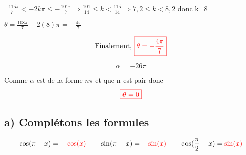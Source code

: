 \documentclass[12pt]{article}
\begin{document}
$\frac{-115\pi}{7}<-2k\pi\leq-\frac{101\pi}{7} \Rightarrow \frac{101}{14}\leq k <\frac{115}{14} \Rightarrow 7,2\leq k <8,2  $ donc k=8

$\theta=\frac{108\pi}{7}-2(8)\pi=-\frac{4\pi}{7}$ 

\[\text{Finalement, }\textcolor{red}{\boxed{\theta=-\frac{4\pi}{7}}}\]

\[\alpha =-26\pi\]

Comme $\alpha$ est de la forme $n\pi$ et que n est pair donc  \[\textcolor{red}{\boxed{\theta=0}}\]
\subsection*{a) Complétons les formules}
\[\cos(\pi+x)=\textcolor{red}{-\cos(x)}\quad\quad \sin(\pi+x)=\textcolor{red}{-\sin(x)}\quad\quad \cos(\frac{\pi}{2}-x)=\textcolor{red}{\sin(x)}\]
\end{document}
